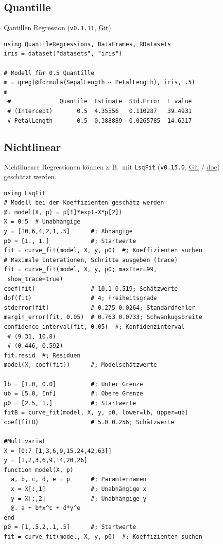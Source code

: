 \documentclass[10pt,twocolumn]{scrartcl}
\begin{document}
\subsection{Quantille}

Qantillen Regression (\lstinline|v0.1.11|,
\href{https://github.com/pkofod/QuantileRegressions.jl}{Git})

\begin{lstlisting}
using QuantileRegressions, DataFrames, RDatasets
iris = dataset("datasets", "iris")

# Modell für 0.5 Quantille
m = qreg(@formula(SepalLength ~ PetalLength), iris, .5)
m
 #              Quantile  Estimate  Std.Error  t value
 # (Intercept)       0.5  4.35556   0.110287   39.4931
 # PetalLength       0.5  0.388889  0.0265785  14.6317
\end{lstlisting}

\subsection{Nichtlinear}

Nichtlineare Regressionen können z.\,B.\ mit \lstinline|LsqFit|
(\lstinline|v0.15.0|, \href{https://github.com/JuliaNLSolvers/LsqFit.jl}{Git} /
\href{https://julianlsolvers.github.io/LsqFit.jl/latest/}{doc}) geschätzt
werden.

\begin{lstlisting}
using LsqFit
# Modell bei dem Koeffizienten geschätz werden
@. model(X, p) = p[1]*exp(-X*p[2])
X = 0:5  # Unabhängige
y = [10,6,4,2,1,.5]      #; Abhängige
p0 = [1., 1.]            #; Startwerte
fit = curve_fit(model, X, y, p0)  #; Koeffizienten suchen
# Maximale Interationen, Schritte ausgeben (trace)
fit = curve_fit(model, X, y, p0; maxIter=99,
 show_trace=true)
coef(fit)                # 10.1 0.519; Schätzwerte
dof(fit)                 # 4; Freiheitsgrade
stderror(fit)            # 0.275 0.0264; Standardfehler
margin_error(fit, 0.05)  # 0.763 0.0733; Schwankugsbreite
confidence_interval(fit, 0.05)  #; Konfidenzinterval
 # (9.31, 10.8)
 # (0.446, 0.592)
fit.resid  #; Residuen
model(X, coef(fit))      #; Modelschätzwerte

lb = [1.0, 0.0]          #; Unter Grenze
ub = [5.0, Inf]          #; Obere Grenze
p0 = [2.5, 1.]           #; Startwerte
fitB = curve_fit(model, X, y, p0, lower=lb, upper=ub)
coef(fitB)               # 5.0 0.256; Schätzwerte

#Multivariat
X = [0:7 [1,3,6,9,15,24,42,63]]
y = [1,2,3,6,9,14,20,26]
function model(X, p)
  a, b, c, d, e = p      #; Paramternamen
  x = X[:,1]             #; Unabhängige x
  y = X[:,2]             #; Unabhängige y
  @. a + b*x^c + d*y^e
end
p0 = [1,.5,2,.1,.5]      #; Startwerte
fit = curve_fit(model, X, y, p0)  #; Koeffizienten suchen
\end{lstlisting}
\end{document}
